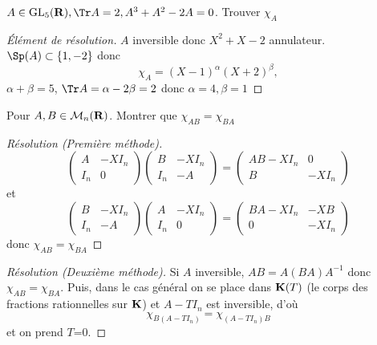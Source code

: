 \begin{exo}
    $A\in\mathrm{GL}_5(\R), \Tr A=2, A^3+A^2-2A=0$. Trouver $\chi_A$
\end{exo}

\begin{proof}[Élément de résolution]
    $A$ inversible donc $X^2+X-2$ annulateur. $\Sp(A)\subset \{1, -2\}$ donc \[\chi_A=(X-1)^\alpha(X+2)^\beta,\] $\alpha+\beta=5$, $\Tr A=\alpha-2\beta=2$ donc $\alpha=4, \beta=1$
\end{proof}

\begin{exo}
    Pour $A, B\in\mathcal M_n(\mathbf R)$. Montrer que $\chi_{AB}=\chi_{BA}$
\end{exo}

\begin{proof}[Résolution (Première méthode)]
    \[
        \begin{pmatrix}
            A & -XI_n \\ I_n & 0
        \end{pmatrix} \begin{pmatrix}
            B & -XI_n \\ I_n & -A
        \end{pmatrix}= \begin{pmatrix}
            AB-XI_n & 0 \\ B & -XI_n
        \end{pmatrix}
    \]
    et \[
        \begin{pmatrix}
            B & -XI_n \\ I_n & -A
        \end{pmatrix} \begin{pmatrix}
            A & -XI_n \\ I_n & 0
        \end{pmatrix} = \begin{pmatrix}
            BA-XI_n & -XB \\ 0 & -XI_n
        \end{pmatrix}
    \]
    donc $\chi_{AB}=\chi_{BA}$
\end{proof}

\begin{proof}[Résolution (Deuxième méthode)]
    Si $A$ inversible, $AB=A(BA)A^{-1}$ donc $\chi_{AB}=\chi_{BA}$. Puis, dans le cas général on se place dans $\mathbf K(T)$ (le corps des fractions rationnelles sur $\mathbf K$) et $A-TI_n$ est inversible, d'où \[
        \chi_{B(A-TI_n)}=\chi_{(A-TI_n)B}
    \]
    et on prend $T$=0.
\end{proof}

